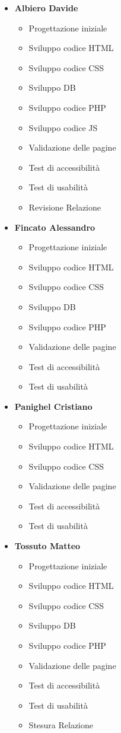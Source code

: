 \begin{itemize}	
	\item \textbf{Albiero Davide}
	\begin{itemize}
		\item Progettazione iniziale
		\item Sviluppo codice HTML
		\item Sviluppo codice CSS
		\item Sviluppo DB
		\item Sviluppo codice PHP
		\item Sviluppo codice JS
		\item Validazione delle pagine
		\item Test di accessibilità
		\item Test di usabilità
		\item Revisione Relazione
	\end{itemize}	
	\item \textbf{Fincato Alessandro}
	\begin{itemize}
		\item Progettazione iniziale
		\item Sviluppo codice HTML
		\item Sviluppo codice CSS
		\item Sviluppo DB
		\item Sviluppo codice PHP
		\item Validazione delle pagine
		\item Test di accessibilità
		\item Test di usabilità
	\end{itemize}	
	\item \textbf{Panighel Cristiano}
	\begin{itemize}
		\item Progettazione iniziale
		\item Sviluppo codice HTML
		\item Sviluppo codice CSS
		\item Validazione delle pagine
		\item Test di accessibilità
		\item Test di usabilità
	\end{itemize}	
	\item \textbf{Tossuto Matteo}
	\begin{itemize}
		\item Progettazione iniziale
		\item Sviluppo codice HTML
		\item Sviluppo codice CSS
		\item Sviluppo DB
		\item Sviluppo codice PHP
		\item Validazione delle pagine
		\item Test di accessibilità
		\item Test di usabilità
		\item Stesura Relazione
	\end{itemize}
\end{itemize}

